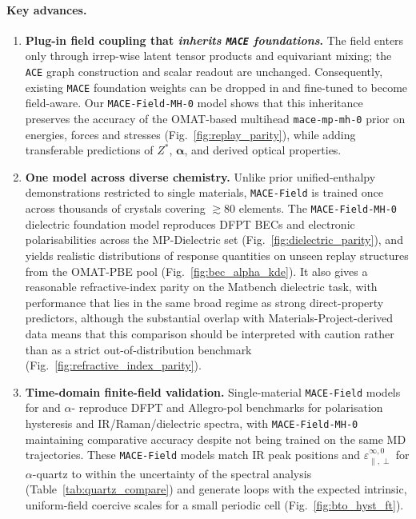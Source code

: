 \documentclass[aps,physrev,graphicx,amsmath,amssymb,
               reprint,superscriptaddress]{revtex4-2}
\begin{document}
\paragraph*{Key advances.}
\begin{enumerate}
  \item \textbf{Plug-in field coupling that \emph{inherits \texttt{MACE} foundations}.}
  The field enters only through irrep-wise latent tensor products and equivariant mixing; the \texttt{ACE} graph
  construction and scalar readout are unchanged. Consequently, existing \texttt{MACE} foundation weights
  can be dropped in and fine-tuned to become field-aware. Our \texttt{MACE-Field-MH-0} model shows that this
  inheritance preserves the accuracy of the OMAT-based multihead \texttt{mace-mp-mh-0} prior on energies, forces and stresses (Fig.~\ref{fig:replay_parity}),
  while adding transferable predictions of $Z^*$, $\boldsymbol\alpha$, and derived optical properties.

  \item \textbf{One model across diverse chemistry.}
  Unlike prior unified-enthalpy demonstrations restricted to single materials, \texttt{MACE-Field} is trained
  once across thousands of crystals covering $\gtrsim 80$ elements. The \texttt{MACE-Field-MH-0} dielectric foundation
  model reproduces DFPT BECs and electronic polarisabilities across the MP-Dielectric set (Fig.~\ref{fig:dielectric_parity}),
  and yields realistic distributions of response quantities on unseen replay structures from the OMAT-PBE pool
  (Fig.~\ref{fig:bec_alpha_kde}). It also gives a reasonable refractive-index parity on the Matbench dielectric task, with performance that lies in the same broad regime as strong direct-property predictors, although the substantial overlap with Materials-Project-derived data means that this comparison should be interpreted with caution rather than as a strict out-of-distribution benchmark (Fig.~\ref{fig:refractive_index_parity}).

  \item \textbf{Time-domain finite-field validation.}
  Single-material \texttt{MACE-Field} models for  and $\alpha$- reproduce DFPT and Allegro-pol benchmarks for polarisation hysteresis and IR/Raman/dielectric spectra, with \texttt{MACE-Field-MH-0} maintaining comparative accuracy despite not being trained on the same MD trajectories. These \texttt{MACE-Field} models match IR peak positions and $\varepsilon^{\infty,0}_{\parallel,\perp}$ for $\alpha$-quartz to within the uncertainty
  of the spectral analysis (Table~\ref{tab:quartz_compare}) and generate  loops with the expected intrinsic,
  uniform-field coercive scales for a small periodic cell (Fig.~\ref{fig:bto_hyst_ft}).
\end{enumerate}
\par{} %
\end{document}
